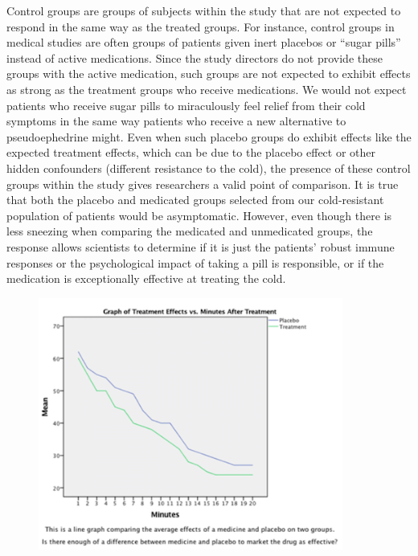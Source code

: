 \documentclass[11pt, chapterprefix=true]{scrbook}\usepackage[]{graphicx}\usepackage[]{color}
\begin{document}
Control groups are groups of subjects within the study that are not expected to respond in the same way as the treated groups.  For instance, control groups in medical studies are often groups of patients given inert placebos or ``sugar pills'' instead of active medications. Since the study directors do not provide these groups with the active medication, such groups are not expected to exhibit effects as strong as the treatment groups who receive medications.  We would not expect patients who receive sugar pills to miraculously feel relief from their cold symptoms in the same way patients who receive a new alternative to pseudoephedrine might. Even when such placebo groups do exhibit effects like the expected treatment effects, which can be due to the placebo effect or other hidden confounders (different resistance to the cold), the presence of these control groups within the study gives researchers a valid point of comparison. It is true that both the placebo and medicated groups selected from our cold-resistant population of patients would be asymptomatic. However, even though there is less sneezing when comparing the medicated and unmedicated groups, the response allows scientists to determine if it is just the patients' robust immune responses or the psychological impact of taking a pill is responsible, or if the medication is exceptionally effective at treating the cold.


\begin{figure}[ht]
   \centering
   \includegraphics[width=10cm]{chapters/Chapter_5/ext_figure/timeVsRx.png} %
\end{figure}
\end{document}
